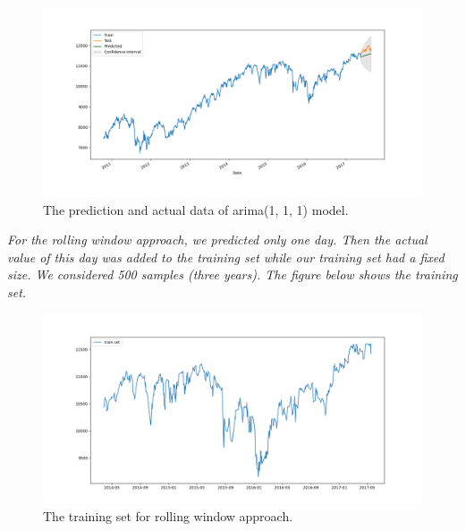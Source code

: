 \begin{figure}[H]
    \centering
    \begin{minipage}[b]{1\textwidth}
        \includegraphics[width=\textwidth]{manuscript/src/figures/Ass2/Ass2_Q2_Automatic_model_forcasting.png}
    \end{minipage}
    \caption{The prediction and actual data of \gls{arima}(1, 1, 1) model.}
    \label{fig:Ass2_Q2_Automatic_model_forcasting}
\end{figure}


\textit{For the rolling window approach, we predicted only one day. Then the actual value of this day was added to the training set while our training set had a fixed size. We considered 500 samples (three years). The figure below shows the training set.}
\begin{figure}[H]
    \centering
    \begin{minipage}[b]{1\textwidth}
        \includegraphics[width=\textwidth]{manuscript/src/figures/Ass2/Ass2_Q2_Rolling_trainset.png}
    \end{minipage}
    \caption{The training set for rolling window approach.}
    \label{fig:Ass2_Q2_Rolling_trainset}
\end{figure}


